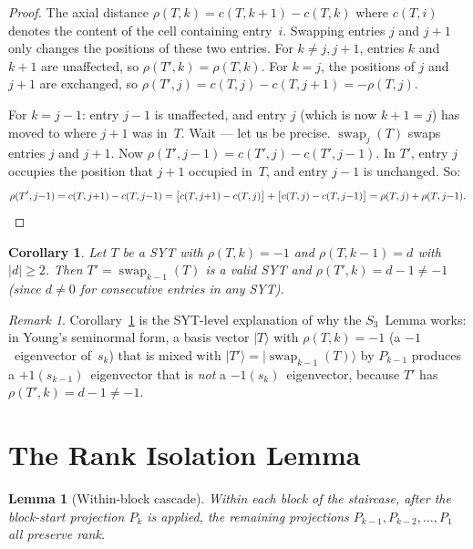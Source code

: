 \documentclass[12pt]{article}
\newtheorem{lemma}[theorem]{Lemma}
\newtheorem{corollary}[theorem]{Corollary}
\theoremstyle{definition}
\theoremstyle{remark}
\newtheorem{remark}[theorem]{Remark}
\begin{document}
\begin{proof}
The axial distance $\rho(T, k) = c(T, k{+}1) - c(T, k)$ where $c(T, i)$ denotes
the content of the cell containing entry~$i$.  Swapping entries $j$ and $j{+}1$
only changes the positions of these two entries.  For $k \neq j, j{+}1$, entries
$k$ and $k{+}1$ are unaffected, so $\rho(T', k) = \rho(T, k)$.  For $k = j$,
the positions of $j$ and $j{+}1$ are exchanged, so $\rho(T', j) = c(T, j) - c(T, j{+}1)
= -\rho(T, j)$.

For $k = j - 1$: entry $j{-}1$ is unaffected, and entry $j$ (which is now
$k{+}1 = j$) has moved to where $j{+}1$ was in~$T$.  Wait --- let us be precise.
$\operatorname{swap}_j(T)$ swaps entries $j$ and $j{+}1$.  Now $\rho(T', j{-}1) =
c(T', j) - c(T', j{-}1)$.  In $T'$, entry $j$ occupies the position that $j{+}1$
occupied in~$T$, and entry $j{-}1$ is unchanged.  So:
\[
  \rho(T', j{-}1) = c(T, j{+}1) - c(T, j{-}1)
  = \bigl[c(T, j{+}1) - c(T, j)\bigr] + \bigl[c(T, j) - c(T, j{-}1)\bigr]
  = \rho(T, j) + \rho(T, j{-}1).  \qedhere
\]
\end{proof}

\begin{corollary}
\label{cor:swap-preserves}
Let $T$ be a SYT with $\rho(T, k) = -1$ and $\rho(T, k{-}1) = d$ with $|d| \ge 2$.
Then $T' = \operatorname{swap}_{k-1}(T)$ is a valid SYT and $\rho(T', k) = d - 1 \neq -1$
(since $d \neq 0$ for consecutive entries in any SYT\textup{)}.
\end{corollary}

\begin{remark}
Corollary~\ref{cor:swap-preserves} is the SYT-level explanation of why the
$S_3$~Lemma works: in Young's seminormal form, a basis vector $|T\rangle$ with
$\rho(T, k) = -1$ (a $-1$~eigenvector of~$s_k$) that is mixed with
$|T'\rangle = |\operatorname{swap}_{k-1}(T)\rangle$ by $P_{k-1}$ produces a
$+1(s_{k-1})$~eigenvector that is \emph{not} a $-1(s_k)$~eigenvector, because
$T'$ has $\rho(T', k) = d - 1 \neq -1$.
\end{remark}

\section{The Rank Isolation Lemma}

\begin{lemma}[Within-block cascade]
\label{lem:cascade}
Within each block of the staircase, after the block-start projection $P_k$ is applied,
the remaining projections $P_{k-1}, P_{k-2}, \ldots, P_1$ all preserve rank.
\end{lemma}
\end{document}
